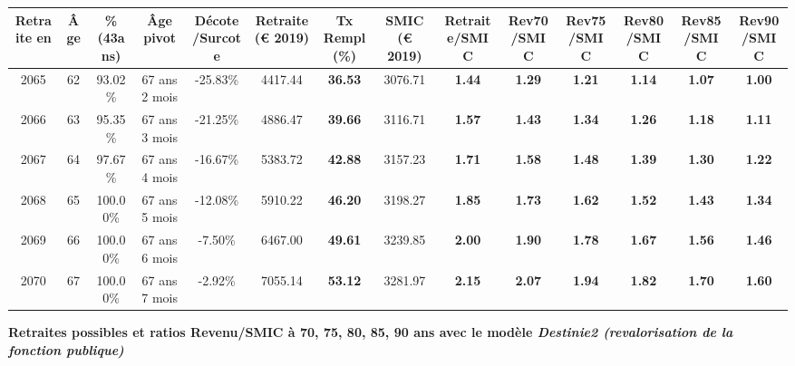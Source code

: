 \begin{adjustbox}{max width=\textwidth} 
\begin{tabular}[htb]{|c|c||c|c|c||c|c||c||c|c|c|c|c|c|} 
\hline 
 Retraite en &  Âge &  \%(43ans) &  Âge pivot &  Décote/Surcote &  Retraite (\euro{} 2019) &  Tx Rempl(\%) &  SMIC (\euro{} 2019) &  Retraite/SMIC &  Rev70/SMIC &  Rev75/SMIC &  Rev80/SMIC &  Rev85/SMIC &  Rev90/SMIC \\ 
\hline \hline 
 2065 &  62 &  93.02\% &  67 ans 2 mois &  -25.83\% &  4417.44 &  {\bf 36.53} &  3076.71 &  {\bf 1.44} &  {\bf 1.29} &  {\bf 1.21} &  {\bf 1.14} &  {\bf 1.07} &  {\bf 1.00} \\ 
\hline 
 2066 &  63 &  95.35\% &  67 ans 3 mois &  -21.25\% &  4886.47 &  {\bf 39.66} &  3116.71 &  {\bf 1.57} &  {\bf 1.43} &  {\bf 1.34} &  {\bf 1.26} &  {\bf 1.18} &  {\bf 1.11} \\ 
\hline 
 2067 &  64 &  97.67\% &  67 ans 4 mois &  -16.67\% &  5383.72 &  {\bf 42.88} &  3157.23 &  {\bf 1.71} &  {\bf 1.58} &  {\bf 1.48} &  {\bf 1.39} &  {\bf 1.30} &  {\bf 1.22} \\ 
\hline 
 2068 &  65 &  100.00\% &  67 ans 5 mois &  -12.08\% &  5910.22 &  {\bf 46.20} &  3198.27 &  {\bf 1.85} &  {\bf 1.73} &  {\bf 1.62} &  {\bf 1.52} &  {\bf 1.43} &  {\bf 1.34} \\ 
\hline 
 2069 &  66 &  100.00\% &  67 ans 6 mois &  -7.50\% &  6467.00 &  {\bf 49.61} &  3239.85 &  {\bf 2.00} &  {\bf 1.90} &  {\bf 1.78} &  {\bf 1.67} &  {\bf 1.56} &  {\bf 1.46} \\ 
\hline 
 2070 &  67 &  100.00\% &  67 ans 7 mois &  -2.92\% &  7055.14 &  {\bf 53.12} &  3281.97 &  {\bf 2.15} &  {\bf 2.07} &  {\bf 1.94} &  {\bf 1.82} &  {\bf 1.70} &  {\bf 1.60} \\ 
\hline 
\hline 
\end{tabular} 
\end{adjustbox} 
 
 \vspace{0.1cm} 
{\bf \noindent Retraites possibles et ratios Revenu/SMIC à 70, 75, 80, 85, 90 ans avec le modèle \emph{Destinie2 (revalorisation de la fonction publique)}}  
 
